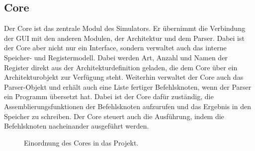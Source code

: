 \subsection{Core}
\label{Dev-Kapitel: Core}

Der Core ist das zentrale Modul des Simulators. Er übernimmt die Verbindung der
GUI mit den anderen Modulen, der Architektur und dem Parser. Dabei ist der Core
aber nicht nur ein Interface, sondern verwaltet auch das interne Speicher- und
Registermodell. Dabei werden Art, Anzahl und Namen der Register direkt aus der
Architekturdefinition geladen, die dem Core über ein Architekturobjekt zur
Verfügung steht. Weiterhin verwaltet der Core auch das Parser-Objekt und erhält
auch eine Liste fertiger Befehlsknoten, wenn der Parser ein Programm übersetzt
hat. Dabei ist der Core dafür zuständig, die Assemblierungsfunktionen der
Befehlsknoten aufzurufen und das Ergebnis in den Speicher zu schreiben. Der Core
steuert auch die Ausführung, indem die Befehlsknoten nacheinander ausgeführt
werden.

\begin{figure}[H]
    \begin{center}
    \end{center}
    \caption{Einordnung des Cores in das Projekt.}
    \label{fig:core-overview}
\end{figure}


